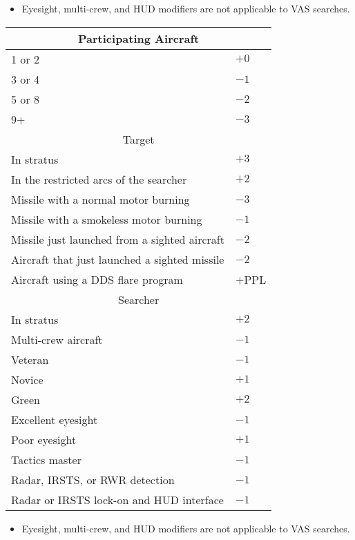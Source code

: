 {\begin{twocolumntablefloat}[t]
\begin{twocolumntable}
\begin{multicols}{2}
{\begin{onecolumntable}
\begin{tablenote}{1.0\linewidth}
\begin{itemize}
    \item Eyesight, multi-crew, and HUD modifiers are not applicable to VAS searches.
\end{itemize}
\end{tablenote}
\end{onecolumntable}
}{
\begin{onecolumntable}
\begin{tabularx}{1.0\linewidth}{Xl}
\toprule
\multicolumn{2}{c}{Participating Aircraft}\\
\midrule1 or 2&$+0$\\
3 or 4&$-1$\\
5 or 8&$-2$\\
9+    &$-3$\\
\midrule
\multicolumn{2}{c}{Target}\\
\midrule
In stratus&$+3$\\
In the restricted arcs of the searcher&$+2$\\
Missile with a normal motor burning&$-3$\\
Missile with a smokeless motor burning&$-1$\\
Missile just launched from a sighted aircraft&$-2$\\
Aircraft that just launched a sighted missile&$-2$\\
Aircraft using a DDS flare program&$+$PPL\\
\midrule
\multicolumn{2}{c}{Searcher}\\
\midrule
In stratus&$+2$\\
Multi-crew aircraft&$-1$\\
Veteran&$-1$\\
Novice&$+1$\\
Green&$+2$\\
Excellent eyesight&$-1$\\
Poor eyesight&$+1$\\
Tactics master&$-1$\\
Radar, IRSTS, or RWR detection&$-1$\\
Radar or IRSTS lock-on and HUD interface&$-1$\\
\bottomrule
\end{tabularx}
\begin{tablenote}{1.0\linewidth}
\begin{itemize}
    \item Eyesight, multi-crew, and HUD modifiers are not applicable to VAS searches.
\end{itemize}
\end{tablenote}
\end{onecolumntable}
}

\end{multicols}
\end{twocolumntable}
\end{twocolumntablefloat}
}
